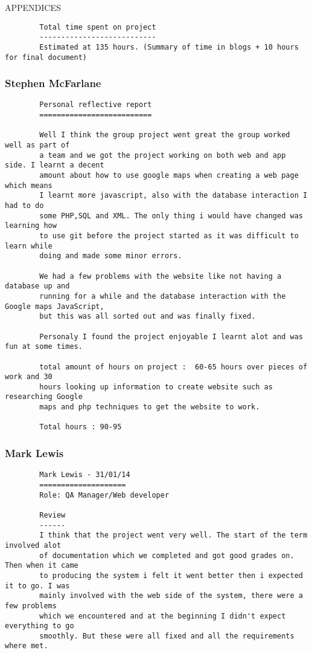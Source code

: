 \documentclass{article}
\begin{document}
\begin{section}{APPENDICES}
\begin{verbatim}
		Total time spent on project
		---------------------------
		Estimated at 135 hours. (Summary of time in blogs + 10 hours for final document)
		\end{verbatim}
		
		\clearpage
		\subsubsection{Stephen McFarlane}
		
		\begin{verbatim}
		Personal reflective report
		==========================
		
		Well I think the group project went great the group worked well as part of
		a team and we got the project working on both web and app side. I learnt a decent
		amount about how to use google maps when creating a web page which means
		I learnt more javascript, also with the database interaction I had to do
		some PHP,SQL and XML. The only thing i would have changed was learning how
		to use git before the project started as it was difficult to learn while 
		doing and made some minor errors.

		We had a few problems with the website like not having a database up and 
		running for a while and the database interaction with the Google maps JavaScript, 
		but this was all sorted out and was finally fixed.

		Personaly I found the project enjoyable I learnt alot and was fun at some times. 

		total amount of hours on project :  60-65 hours over pieces of work and 30 
		hours looking up information to create website such as researching Google 
		maps and php techniques to get the website to work.

		Total hours : 90-95
		\end{verbatim}
		
		\clearpage
		\subsubsection{Mark Lewis}
		\begin{verbatim}
		Mark Lewis - 31/01/14
		====================
		Role: QA Manager/Web developer

		Review
		------
		I think that the project went very well. The start of the term involved alot 
		of documentation which we completed and got good grades on. Then when it came 
		to producing the system i felt it went better then i expected it to go. I was 
		mainly involved with the web side of the system, there were a few problems 
		which we encountered and at the beginning I didn't expect everything to go 
		smoothly. But these were all fixed and all the requirements where met.
		

\end{verbatim}
\end{section}
\end{document}

